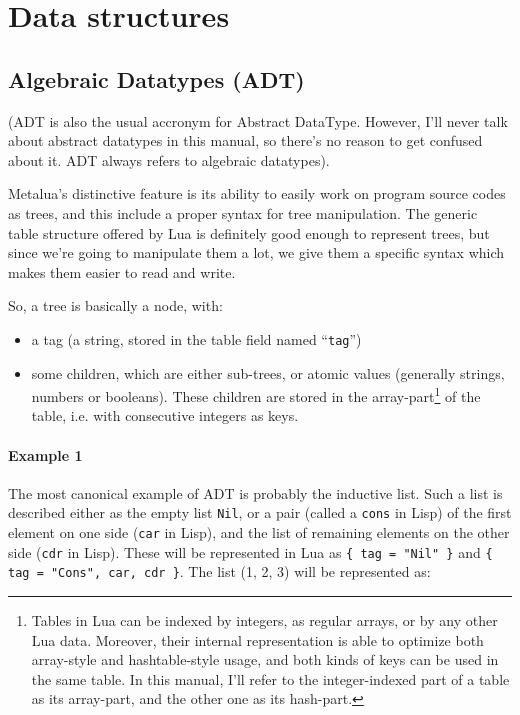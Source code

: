 \section{Data structures}

\subsection{Algebraic Datatypes (ADT)}

(ADT is also the usual accronym for Abstract DataType. However, I'll
never talk about abstract datatypes in this manual, so there's no
reason to get confused about it. ADT always refers to algebraic
datatypes). 

Metalua's distinctive feature is its ability to easily work on program
source codes as trees, and this include a proper syntax for tree
manipulation. The generic table structure offered by Lua is
definitely good enough to represent trees, but since we're going to
manipulate them a lot, we give them a specific syntax which makes them
easier to read and write.

So, a tree is basically a node, with:
\begin{itemize}
\item a tag (a string, stored in the table field named ``{\tt tag}'')
\item some children, which are either sub-trees, or atomic values
  (generally strings, numbers or booleans). These children are stored
  in the array-part\footnote{Tables in Lua can be indexed by integers,
    as regular arrays, or by any other Lua data. Moreover, their
    internal representation is able to optimize both array-style and
    hashtable-style usage, and both kinds of keys can be used in the
    same table. In this manual, I'll refer to the integer-indexed part
    of a table as its array-part, and the other one as its hash-part.}
  of the table, i.e. with consecutive integers as keys.
\end{itemize}

\paragraph{Example 1}

The most canonical example of ADT is probably the inductive list. Such
a list is described either as the empty list \verb+Nil+, or a pair
(called a \verb+cons+ in Lisp) of the first element on one side
(\verb+car+ in Lisp), and the list of remaining elements on the other
side (\verb+cdr+ in Lisp). These will be represented in Lua as
\verb+{ tag = "Nil" }+ and {\tt\{ tag = "Cons", car, cdr \}}. The list
(1, 2, 3) will be represented as:

